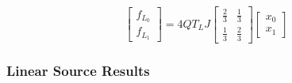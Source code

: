 \documentclass[11pt]{article}
\begin{document}
\begin{equation} \label{eq:linSresult}
\begin{bmatrix}
f_{L_0}\\[1ex]
 f_{L_1} 
\end{bmatrix}
= 4QT_L J 
\begin{bmatrix}
\frac{2}{3} & \frac{1}{3}  \\[1ex]
 \frac{1}{3}  & \frac{2}{3}
\end{bmatrix}
\begin{bmatrix}
x_{0} \\[1ex] x_{1} 
\end{bmatrix}
\end{equation}
\clearpage


\subsubsection{Linear Source Results}
\end{document}
